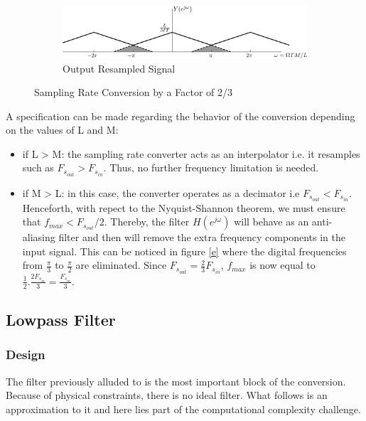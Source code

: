 \begin{figure}[H]
\par\bigskip
\centering
\begin{subfigure}[b]{\textwidth}
	\centering
	\includegraphics[scale=1]{DTFT_resampler_f.png}
	\caption{Output Resampled Signal}\label{f}
\end{subfigure}
		\caption{Sampling Rate Conversion by a Factor of 2/3}\label{Figure 3.4}
\end{figure}

A specification can be made regarding the behavior of the conversion depending on the values of L and M:

\begin{itemize}
	\item if L > M: the sampling rate converter acts as an interpolator i.e. it resamples such as $F_{s_{out}} > F_{s_{in}}$. Thus, no further frequency limitation is needed.
	\item if M > L: in this case, the converter operates as a decimator i.e $F_{s_{out}} < F_{s_{in}}$. Henceforth, with repect to the Nyquist-Shannon theorem, we must ensure that $f_{max} < F_{s_{out}}/2$. Thereby, the filter $H(e^{j\omega})$ will behave as an anti-aliasing filter and then will remove the extra frequency components in the input signal. This can be noticed in figure \ref{e} where the digital frequencies from $\frac{\pi}{3}$ to $\frac{\pi}{2}$ are eliminated. Since $F_{s_{out}} = \frac{2}{3} F_{s_{in}}$, $f_{max}$ is now equal to $\frac{1}{2}.\frac{2F_{s_{in}}}{3} = \frac{F_{s_{in}}}{3}$.
\end{itemize}


\subsection{Lowpass Filter}\label{section 3.1.3}

\subsubsection{Design}

The filter previously alluded to is the most important block of the conversion. Because of physical constraints, there is no ideal filter. What follows is an approximation to it and here lies part of the computational complexity challenge.

